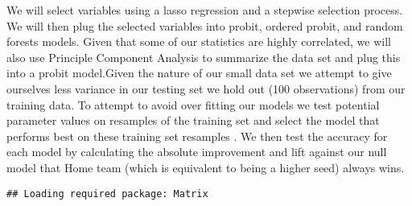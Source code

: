 \documentclass[
]{article}
\begin{document}
We will select variables using a lasso regression and a stepwise
selection process. We will then plug the selected variables into probit,
ordered probit, and random forests models. Given that some of our
statistics are highly correlated, we will also use Principle Component
Analysis to summarize the data set and plug this into a probit
model.Given the nature of our small data set we attempt to give
ourselves less variance in our testing set we hold out (100
observations) from our training data. To attempt to avoid over fitting
our models we test potential parameter values on resamples of the
training set and select the model that performs best on these training
set resamples . We then test the accuracy for each model by calculating
the absolute improvement and lift against our null model that Home team
(which is equivalent to being a higher seed) always wins.

\begin{verbatim}
## Loading required package: Matrix
\end{verbatim}
\end{document}
